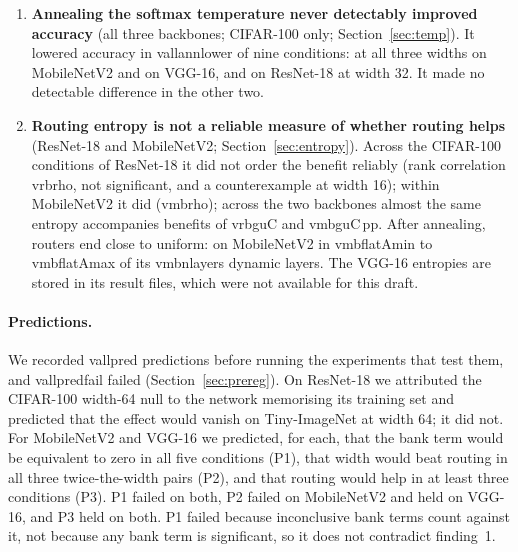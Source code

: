 \documentclass[10pt,a4paper]{article}
\newcommand{\V}[1]{\csname v#1\endcsname}
\begin{document}
\begin{enumerate}
{fixed and on the backbone} (Section~\ref{sec:cost}). A plain network of
twice the width, which on ResNet-18 and VGG-16 has the same number of
parameters as the routed one, beats it in all six pairs on those two
backbones; on MobileNetV2, where it has \V{mbpinvlo} to \V{mbpinvhi} times
the routed network's parameters, it wins one of three. At equal width,
where routing adds at most \V{rbmacextra}, \V{mbmacextra} and
\V{vgmacextra}\,\% to the multiply-accumulates, routing wins \V{rbeqmac},
\V{mbeqmac} and \V{vgeqmac} of five conditions on ResNet-18, MobileNetV2
and VGG-16.
\item \textbf{Annealing the softmax temperature never detectably improved
accuracy} (all three backbones; CIFAR-100 only; Section~\ref{sec:temp}).
It lowered accuracy in \V{allannlower} of nine conditions: at all three
widths on MobileNetV2 and on VGG-16, and on ResNet-18 at width 32. It made
no detectable difference in the other two.
\item \textbf{Routing entropy is not a reliable measure of whether
routing helps} (ResNet-18 and MobileNetV2; Section~\ref{sec:entropy}).
Across the CIFAR-100 conditions of ResNet-18 it did not order the benefit
reliably (rank correlation \V{rbrho}, not significant, and a
counterexample at width 16); within MobileNetV2 it did (\V{mbrho}); across
the two backbones almost the same entropy accompanies benefits of
\V{rbguC} and \V{mbguC}\,pp. After annealing, routers end close to
uniform: on MobileNetV2 in \V{mbflatAmin} to \V{mbflatAmax} of its
\V{mbnlayers} dynamic layers. The VGG-16 entropies are stored in its result
files, which were not available for this draft.
\end{enumerate}

\paragraph{Predictions.} We recorded \V{allpred} predictions before running
the experiments that test them, and \V{allpredfail} failed
(Section~\ref{sec:prereg}). On ResNet-18 we attributed the CIFAR-100
width-64 null to the network memorising its training set and predicted
that the effect would vanish on Tiny-ImageNet at width 64; it did not. For
MobileNetV2 and VGG-16 we predicted, for each, that the bank term would be
equivalent to zero in all five conditions (P1), that width would beat
routing in all three twice-the-width pairs (P2), and that routing would
help in at least three conditions (P3). P1 failed on both, P2 failed on
MobileNetV2 and held on VGG-16, and P3 held on both. P1 failed because
inconclusive bank terms count against it, not because any bank term is
significant, so it does not contradict finding~1.
\end{document}

